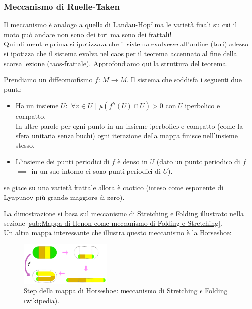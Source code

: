 \subsubsection{Meccanismo di Ruelle-Taken}%
\label{subsub:Meccanismo di Ruelle-Taken}
Il meccanismo è analogo a quello di Landau-Hopf ma le varietà finali su cui il moto può andare non sono dei tori ma sono dei frattali!\\
Quindi mentre prima si ipotizzava che il sistema evolvesse all'ordine (tori) adesso si ipotizza che il sistema evolva nel caos per il teorema accennato al fine della scorsa lezione (caos-frattale). Approfondiamo qui la struttura del teorema.
\begin{thm}[Axiom A]
    Prendiamo un diffeomorfismo $f: \ M\to M$. Il sistema che soddisfa i seguenti due punti:
    \begin{itemize}
	\item Ha un insieme $U:$ $\forall x \in U$ $|$ $\mu (f^h(U) \cap U) > 0 $ con $U$ iperbolico e compatto.\\
	    In altre parole per ogni punto in un insieme iperbolico e compatto (come la sfera unitaria senza buchi) ogni iterazione della mappa finisce nell'insieme stesso.
	\item L'insieme dei punti periodici di $f$ è denso in $U$ (dato un punto periodico di $f$ $\implies$ in un suo intorno ci sono punti periodici di $U$).
    \end{itemize}
    se giace su una varietà frattale allora è caotico (inteso come esponente di Lyapunov più grande maggiore di zero).\\
\end{thm}
\noindent
La dimostrazione si basa sul meccanismo di Stretching e Folding illustrato nella sezione \ref{sub:Mappa di Henon come meccanismo di Folding e Stretching}. \\
Un altra mappa interessante che illustra questo meccanismo è la Horseshoe:
\begin{figure}[H]
    \centering
    \includegraphics[width=0.4\textwidth]{figures/horseshoe.png}
    \caption{\scriptsize Step della mappa di Horseshoe: meccanismo di Stretching e Folding (wikipedia).}
    \label{fig:figures-horseshoe-png}
\end{figure}
